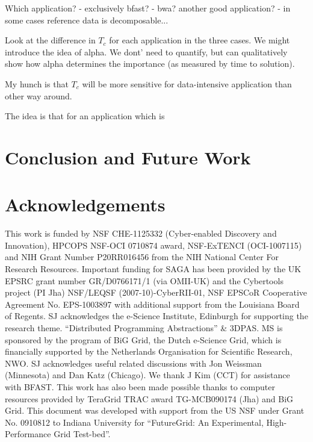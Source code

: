 \documentclass[conference]{IEEEtran}
\begin{document}
Which application?
- exclusively bfast?
- bwa? another good application?
- in some cases reference data is decomposable...

Look at the difference in $T_c$ for each application in the three
cases. We might introduce the idea of alpha. We dont' need to
quantify, but can qualitatively show how alpha determines the
importance (as measured by time to solution). 

My hunch is that $T_c$ will be more sensitive for data-intensive
application than other way around.

The idea is that for an application which is



\section{Conclusion and Future Work}

\section*{Acknowledgements}
\footnotesize \footnotesize{This work is funded by NSF CHE-1125332
  (Cyber-enabled Discovery and Innovation), HPCOPS NSF-OCI 0710874
  award, NSF-ExTENCI (OCI-1007115) and NIH Grant Number P20RR016456
  from the NIH National Center For Research Resources. Important
  funding for SAGA has been provided by the UK EPSRC grant number
  GR/D0766171/1 (via OMII-UK) and the Cybertools project (PI Jha)
  NSF/LEQSF (2007-10)-CyberRII-01, NSF EPSCoR Cooperative Agreement
  No. EPS-1003897 with additional support from the Louisiana Board of
  Regents.  SJ acknowledges the e-Science Institute, Edinburgh for
  supporting the research theme. ``Distributed Programming
  Abstractions'' \& 3DPAS. MS is sponsored by the program of BiG Grid,
  the Dutch e-Science Grid, which is financially supported by the
  Netherlands Organisation for Scientific Research, NWO. SJ
  acknowledges useful related discussions with Jon Weissman
  (Minnesota) and Dan Katz (Chicago). We thank J Kim (CCT) for
  assistance with BFAST.  This work has also been made possible thanks
  to computer resources provided by TeraGrid TRAC award TG-MCB090174
  (Jha) and BiG Grid.  This document was developed with support from
  the US NSF under Grant No. 0910812 to Indiana University for
  ``FutureGrid: An Experimental, High-Performance Grid Test-bed''.}

  


\end{document}
